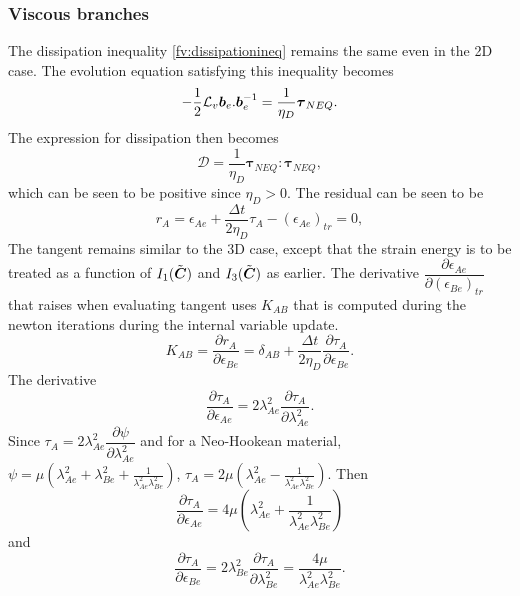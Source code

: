 \documentclass[11pt,twoside,TimesRoman]{article}
\newcommand{\parder}[2]{{\dfrac{\partial #1}{\partial #2}}}
\begin{document}
\subsubsection*{Viscous branches}
The dissipation inequality \ref{fv:dissipationineq} remains the same even in the 2D case. The evolution equation satisfying this inequality becomes
\begin{equation}
	-\frac{1}{2} \mathcal{L}_v\mbox{\boldmath $b$}_e. \mbox{\boldmath $b$}_e^{-1}  = \frac{1}{\eta_D} \boldsymbol{\tau}_{NEQ}.
\end{equation}
The expression for dissipation then becomes 
\begin{equation}
	\mathcal{D} = \frac{1}{\eta_D} \boldsymbol{\tau}_{NEQ}:\boldsymbol{\tau}_{NEQ},
\end{equation}
which can be seen to be positive since $\eta_D>0$. The residual can be seen to be
\begin{equation}
r_A	 = \epsilon_{Ae} + \frac{\Delta t }{2 \eta_D} \tau_A - 	(\epsilon_{Ae})_{tr} = 0,
\label{fv:residualnewtoniter2d}
\end{equation}
The tangent remains similar to the 3D case, except that the strain energy is to be treated as a function of $I_1(\tilde{\mbox{\boldmath $C$}})$ and $I_3(\tilde{\mbox{\boldmath $C$}})$ as earlier. The derivative $\parder{\epsilon_{Ae}}{(\epsilon_{Be})_{tr}}$ that raises when evaluating tangent uses $	K_{AB}$ that is computed during the newton iterations during the internal variable update.
\begin{equation}
	K_{AB} = \parder{r_A}{\epsilon_{Be}} = \delta_{AB} + \frac{\Delta t}{2 \eta_D} \parder{\tau_A}{\epsilon_{Be}}.
\end{equation}
The derivative
\begin{equation}
	\parder{\tau_A}{\epsilon_{Ae}} = 2 \lambda_{Ae}^2 \parder{\tau_A}{\lambda_{Ae}^2}.
\end{equation}
Since $\tau_A = 2 \lambda_{Ae}^2 \parder{\psi}{\lambda_{Ae}^2 }$ and for a Neo-Hookean material, $\psi = \mu \left(\lambda_{Ae}^2 + \lambda_{Be}^2 + \frac{1}{\lambda_{Ae}^2 \lambda_{Be}^2 }\right)$, $\tau_A = 2\mu \left(\lambda_{Ae}^2  - \frac{1}{\lambda_{Ae}^2 \lambda_{Be}^2 }\right)$.
Then 
\begin{equation}
	\parder{\tau_A}{\epsilon_{Ae}} =  4\mu \left(\lambda_{Ae}^2  + \frac{1}{\lambda_{Ae}^2 \lambda_{Be}^2 }\right)
\end{equation}
and 
\begin{equation}
\parder{\tau_A}{\epsilon_{Be}} = 2 \lambda_{Be}^2 \parder{\tau_A}{\lambda_{Be}^2} =  \frac{4\mu}{\lambda_{Ae}^2 \lambda_{Be}^2 } .
\end{equation}


\end{document}

